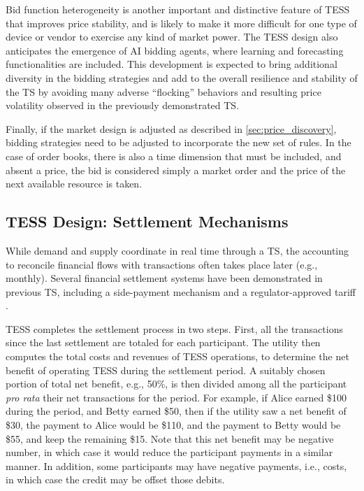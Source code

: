 \documentclass[12pt]{article}{Definitions/mdpi}
\begin{document}
Bid function heterogeneity is another important and distinctive feature of TESS that improves price stability, and is likely to make it more difficult for one type of device or vendor to exercise any kind of market power.
The TESS design also anticipates the emergence of AI bidding agents, where learning and forecasting functionalities are included. This development is expected to bring additional diversity in the bidding strategies and add to the overall resilience and stability of the TS by avoiding many adverse ``flocking'' behaviors and resulting price volatility observed in the previously demonstrated TS.

Finally, if the market design is adjusted as described in \cref{sec:price_discovery}, bidding strategies need to be adjusted to incorporate the new set of rules.
In the case of order books, there is also a time dimension that must be included, and absent a price, the bid is considered simply a market order and the price of the next available resource is taken.

\subsection{TESS Design: Settlement Mechanisms}\label{sec:settlement}

While demand and supply coordinate in real time through a TS, the accounting to reconcile financial flows with transactions often takes place later (e.g., monthly). Several financial settlement systems have been demonstrated in previous TS, including a side-payment mechanism \citep{hammerstrom_2008} and a regulator-approved tariff \citep{Widergren2014}. 

TESS completes the settlement process in two steps. First, all the transactions since the last settlement are totaled for each participant. The utility then computes the total costs and revenues of TESS operations, to determine the net benefit of operating TESS during the settlement period.  A suitably chosen portion of total net benefit, e.g., 50\%, is then divided among all the participant \textit{pro rata} their net transactions for the period.  For example, if Alice earned \$100 during the period, and Betty earned \$50, then if the utility saw a net benefit of \$30, the payment to Alice would be \$110, and the payment to Betty would be \$55, and keep the remaining \$15. Note that this net benefit may be negative number, in which case it would reduce the participant payments in a similar manner. In addition, some participants may have negative payments, i.e., costs, in which case the credit may be offset those debits. 
\end{document}
